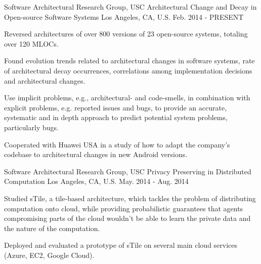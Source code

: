 \begin{cventries}
  \cventry
    {{Software Architectural Research Group}, USC} %
    {Architectural Change and Decay in Open-source Software Systems} %
    {Los Angeles, CA, U.S.} %
    {Feb. 2014 - PRESENT} %
    {
      \begin{cvitems} %
        \item Reversed architectures of over 800 versions of 23 open-source systems, totaling over 120 MLOCs.
        \item Found evolution trends related to architectural changes in software systems, rate of architectural decay occurrences, correlations among implementation decisions and architectural changes.
        \item Use implicit problems, e.g.,
        architectural- and code-smells, in combination with explicit problems, e.g. reported issues and bugs, to provide an accurate, systematic and in depth approach to predict potential system problems, particularly bugs.
        \item Cooperated with Huawei USA in a study of how to adapt the company's codebase to architectural changes in new Android versions.
      \end{cvitems}
    }
   
\cventry
{{Software Architectural Research Group}, USC} %
{Privacy Preserving in Distributed Computation} %
{Los Angeles, CA, U.S.} %
{May. 2014 - Aug. 2014} %
{
  	\begin{cvitems} %
  		\item Studied sTile, a tile-based architecture, which tackles the problem of distributing computation onto cloud, while providing probabilistic guarantees that agents compromising parts of the cloud wouldn't be able to learn the private data and the nature of the computation.
  		\item Deployed and evaluated a prototype of sTile on several main cloud services (Azure, EC2, Google Cloud).
  	\end{cvitems}
}


\end{cventries}
